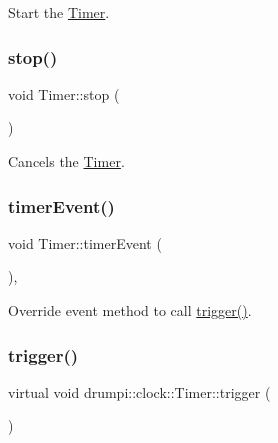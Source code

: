 Start the \hyperlink{classdrumpi_1_1clock_1_1Timer}{Timer}. \mbox{\label{classdrumpi_1_1clock_1_1Timer_a63f0eb44b27402196590a03781515dba}} 
\subsubsection{\texorpdfstring{stop()}{stop()}}
{\footnotesize\ttfamily void Timer\+::stop (\begin{DoxyParamCaption}{ }\end{DoxyParamCaption})}

Cancels the \hyperlink{classdrumpi_1_1clock_1_1Timer}{Timer}. \mbox{\label{classdrumpi_1_1clock_1_1Timer_ab7328c35aba7b6887eea4bb6f90c5659}} 
\subsubsection{\texorpdfstring{timer\+Event()}{timerEvent()}}
{\footnotesize\ttfamily void Timer\+::timer\+Event (\begin{DoxyParamCaption}{ }\end{DoxyParamCaption})\hspace{0.3cm}{\ttfamily [override]}, {\ttfamily [private]}}

Override event method to call \hyperlink{classdrumpi_1_1clock_1_1Timer_aeed4c4e653b98280354e0b970f8df68b}{trigger()}. \mbox{\label{classdrumpi_1_1clock_1_1Timer_aeed4c4e653b98280354e0b970f8df68b}} 
\subsubsection{\texorpdfstring{trigger()}{trigger()}}
{\footnotesize\ttfamily virtual void drumpi\+::clock\+::\+Timer\+::trigger (\begin{DoxyParamCaption}{ }\end{DoxyParamCaption})\hspace{0.3cm}{\ttfamily [pure virtual]}}

